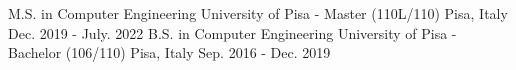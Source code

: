 

\begin{cventries}

  \cventry
    {M.S. in Computer Engineering} %
    {University of Pisa - Master (110L/110)} %
    {Pisa, Italy} %
    {Dec. 2019 - July. 2022} %
    {}
 \cventry
    {B.S. in Computer Engineering} %
    {University of Pisa - Bachelor (106/110)} %
    {Pisa, Italy} %
    {Sep. 2016 - Dec. 2019} %
    {}
\end{cventries}
